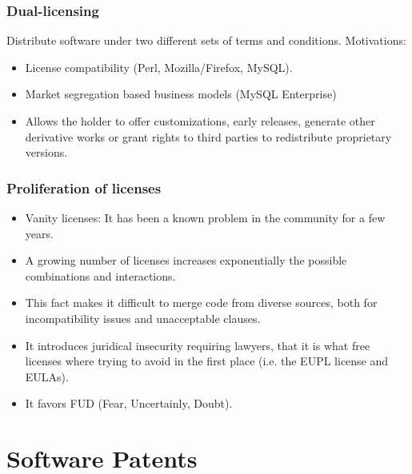 \documentclass{beamer}
\begin{document}
\begin{frame}
\frametitle{Dual-licensing}

Distribute software under two different sets of terms and conditions. Motivations:

\begin{itemize}
\item License compatibility (Perl, Mozilla/Firefox, MySQL).
\item Market segregation based business models (MySQL Enterprise)
\item Allows the holder to offer customizations, early releases, generate other derivative works or grant rights to third parties to redistribute proprietary versions.
\end{itemize}

                                                 
\end{frame}


\begin{frame}
\frametitle{Proliferation of licenses}

\begin{itemize}
\item Vanity licenses: It has been a known problem in the community for a few years.
\item A growing number of licenses increases exponentially the possible combinations and interactions. 
\item This fact makes it difficult to merge code from diverse sources, both for incompatibility issues and unacceptable clauses.
\item It introduces juridical insecurity requiring lawyers, that it is what free licenses where trying to avoid in the first place (i.e. the EUPL license and EULAs).
\item It favors FUD (Fear, Uncertainly, Doubt).
\end{itemize}                                                 

\end{frame}


\section{Software Patents}
\end{document}
